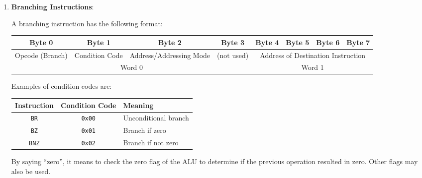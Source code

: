 \begin{enumerate}
\item \textbf{Branching Instructions}:

A branching instruction has the following format:
\begin{table}[H]
    \centering
    \begin{tabular}{ccccclll}
    Byte 0                                & Byte 1                              & Byte 2                                         & Byte 3                          & Byte 4     & Byte 5     & Byte 6     & Byte 7    \\ \hline
    \multicolumn{1}{|c|}{Opcode (Branch)} & \multicolumn{1}{c|}{Condition Code} & \multicolumn{1}{c|}{Address/Addressing Mode} & \multicolumn{1}{c|}{(not used)} & \multicolumn{4}{c|}{Address of Destination Instruction} \\ \hline
    \multicolumn{4}{c}{Word 0}                                                                                                                                     & \multicolumn{4}{c}{Word 1}                      
    \end{tabular}
\end{table}

Examples of condition codes are:
\begin{table}[H]
    \centering
    \begin{tabular}{|c|c|l|}
    \hline
    \textbf{Instruction} & \textbf{Condition Code} & \textbf{Meaning} \\ \hline
    \texttt{BR} & \texttt{0x00} & Unconditional branch \\ \hline
    \texttt{BZ} & \texttt{0x01} & Branch if zero \\ \hline
    \texttt{BNZ} & \texttt{0x02} & Branch if not zero \\ \hline
    \end{tabular}
\end{table}
By saying ``zero'', it means to check the zero flag of the ALU to determine if the previous
operation resulted in zero. Other flags may also be used.


\end{enumerate}
